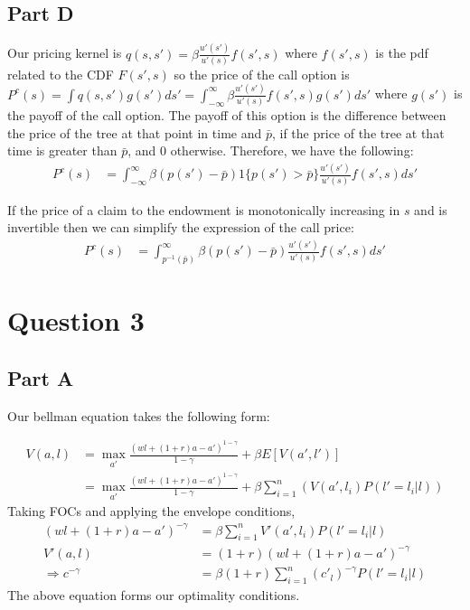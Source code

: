 \documentclass[11pt]{article} %
\begin{document}
\subsection{Part D}
Our pricing kernel is $q(s,s') = \beta \frac{u'(s')}{u'(s)} f(s',s)$ where $f(s',s) $ is the pdf related to the CDF $F(s',s)$ so the price of the call option is $P^c(s) = \int q(s,s') g(s')ds' = \int_{-\infty}^{\infty}\beta \frac{u'(s')}{u'(s)} f(s',s)g(s')ds'$ where $g(s')$ is the payoff of the call option. The payoff of this option is the difference between the price of the tree at that point in time and $\bar{p}$, if the price of the tree at that time is greater than $\bar{p}$, and $0$ otherwise. Therefore, we have the following:
\begin{align*}
P^c(s) &= \int_{-\infty}^{\infty}\beta ( p(s') - \bar{p})1\{ p(s')>\bar{p}\}\frac{u'(s')}{u'(s)} f(s',s)ds'
\end{align*}

If the price of a claim to the endowment is monotonically increasing in $s$ and is invertible then we can simplify the expression of the call price:
\begin{align*}
P^c(s) &= \int_{p^{-1}(\bar{p})}^{\infty}\beta ( p(s') - \bar{p})\frac{u'(s')}{u'(s)} f(s',s)ds'
\end{align*}
\section{Question 3}
\subsection{Part A}
Our bellman equation takes the following form:

\begin{align*}
V(a,l) &= \max_{a'} \frac{(wl +(1+r)a - a')^{1-\gamma}}{1-\gamma} + \beta E[V(a',l')]\\
&=  \max_{a'} \frac{(wl +(1+r)a - a')^{1-\gamma}}{1-\gamma} + \beta \sum_{i=1}^{n} (V(a',l_i)P(l'=l_i|l) )
\end{align*}
Taking FOCs and applying the envelope conditions,
\begin{align*}
(wl +(1+r)a - a')^{-\gamma} &= \beta \sum_{i=1}^{n} V'(a',l_i)P(l'=l_i|l)\\
V'(a,l) &= (1+r)(wl +(1+r)a - a')^{-\gamma}\\
\Rightarrow c^{-\gamma} &= \beta(1+r)\sum_{i=1}^{n} (c'_l)^{-\gamma}P(l'=l_i|l)  
\end{align*}
The above equation forms our optimality conditions.
\end{document}
